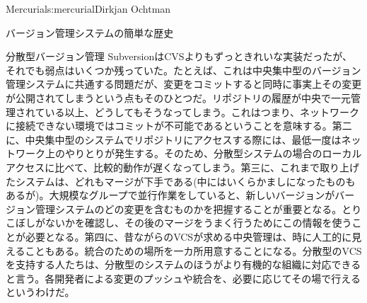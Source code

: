 \begin{aosachapter}{Mercurial}{s:mercurial}{Dirkjan Ochtman}
\begin{aosasect1}{バージョン管理システムの簡単な歴史}
\begin{aosasect2}{分散型バージョン管理}
SubversionはCVSよりもずっときれいな実装だったが、それでも弱点はいくつか残っていた。たとえば、これは中央集中型のバージョン管理システムに共通する問題だが、変更をコミットすると同時に事実上その変更が公開されてしまうという点もそのひとつだ。リポジトリの履歴が中央で一元管理されている以上、どうしてもそうなってしまう。これはつまり、ネットワークに接続できない環境ではコミットが不可能であるということを意味する。第二に、中央集中型のシステムでリポジトリにアクセスする際には、最低一度はネットワーク上のやりとりが発生する。そのため、分散型システムの場合のローカルアクセスに比べて、比較的動作が遅くなってしまう。第三に、これまで取り上げたシステムは、どれもマージが下手である(中にはいくらかましになったものもあるが)。大規模なグループで並行作業をしていると、新しいバージョンがバージョン管理システムのどの変更を含むものかを把握することが重要となる。とりこぼしがないかを確認し、その後のマージをうまく行うためにこの情報を使うことが必要となる。第四に、昔ながらのVCSが求める中央管理は、時に人工的に見えることもある。統合のための場所を一カ所用意することになる。分散型のVCSを支持する人たちは、分散型のシステムのほうがより有機的な組織に対応できると言う。各開発者による変更のプッシュや統合を、必要に応じてその場で行えるというわけだ。


\end{aosasect2}
\end{aosasect1}
\end{aosachapter}
